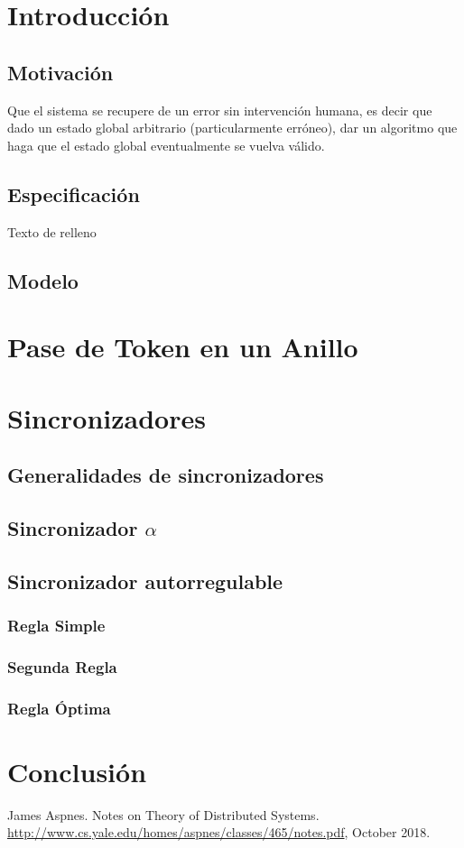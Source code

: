\documentclass[12pt,a4paper]{article}
\begin{document}
\section{Introducción}{
\subsection{Motivación}{
    Que el sistema se recupere de un error sin intervención humana, es decir que
    dado un estado global arbitrario (particularmente erróneo), dar un algoritmo
    que haga que el estado global eventualmente se vuelva válido.
}
\subsection{Especificación}{
    Texto de relleno
}
\subsection{Modelo}{}
}
\section{Pase de Token en un Anillo}{}
\section{Sincronizadores}{
\subsection{Generalidades de sincronizadores}{}

\subsection{Sincronizador $\alpha$}{}

\subsection{Sincronizador autorregulable}{}

    \subsubsection{Regla Simple}{}

    \subsubsection{Segunda Regla}{}

    \subsubsection{Regla Óptima}{}
}
\section{Conclusión}{}

\begin{thebibliography}{}

James Aspnes. Notes on Theory of Distributed Systems.
\href{http://www.cs.yale.edu/homes/aspnes/classes/465/notes.pdf}
{http://www.cs.yale.edu/homes/aspnes/classes/465/notes.pdf}, October 2018.

\end{thebibliography}
\end{document}
